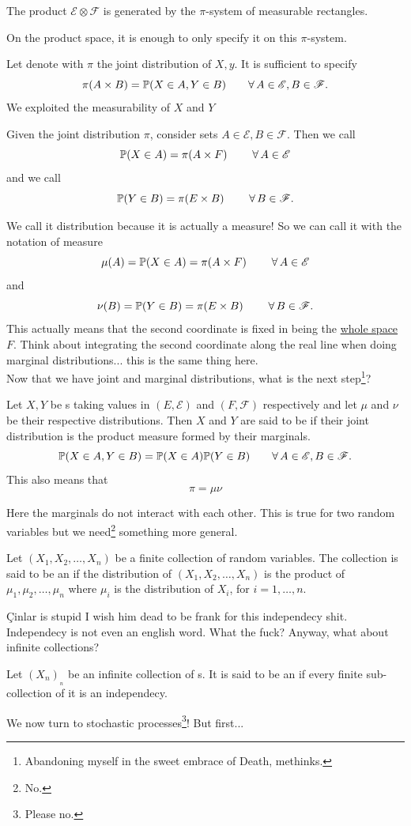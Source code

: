 \documentclass{report}
\begin{document}
\begin{remark}
	The product \sa{} $\mathscr{E}\otimes\mathscr{F}$ is generated by the $\pi$-system of measurable rectangles.
\end{remark}
On the product space, it is enough to only specify it on this $\pi$-system.\par
Let denote with $\pi$ the joint distribution of $X,y$. It is sufficient to specify
\[\pi(A\times B)=\mathbb{P}(X\in A, Y\in B)\qquad\forall\,  A\in\mathscr{E},B\in\mathscr{F}.\]
We exploited the measurability of $X$ and $Y$
\begin{definition}
	Given the joint distribution $\pi$, consider sets $A\in\mathscr{E},B\in\mathscr{F}$. Then we call 
	\[\mathbb{P}(X\in A)=\pi(A\times F)\qquad\;\forall\,  A\in\mathscr{E}\]
	and we call 
	\[\mathbb{P}(Y\in B)=\pi(E\times B)\qquad\;\forall\,  B\in\mathscr{F}.\]
\end{definition}
We call it distribution because it is actually a measure! So we can call it with the notation of measure
	\[\mu(A)=\mathbb{P}(X\in A)=\pi(A\times F)\qquad\;\forall\,  A\in\mathscr{E}\] and \[\nu(B)=\mathbb{P}(Y\in B)=\pi(E\times B)\qquad\;\forall\,  B\in\mathscr{F}.\]This actually means that the second coordinate is fixed in being the \underline{whole space} $F$. Think about integrating the second coordinate along the real line when doing marginal distributions... this is the same thing here.\\
Now that we have joint and marginal distributions, what is the next step\footnote{Abandoning myself in the sweet embrace of Death, methinks.}?
\begin{definition}
	Let $X,Y$ be \rv s taking values in $(E,\mathscr{E})$ and $(F,\mathscr{F})$ respectively and let $\mu$ and $\nu$ be their respective distributions. Then $X$ and $Y$ are said to be  if their joint distribution is the product measure formed by their marginals.
	\[\mathbb{P}(X\in A,Y\in B)=\mathbb{P}(X\in A)\mathbb{P}(Y\in B)\qquad\forall\,  A\in \mathscr{E},B\in\mathscr{F}.\]
	This also means that 
	\[\pi=\mu\nu\]
\end{definition}
Here the marginals do not interact with each other. This is true for two random variables but we need\footnote{No.} something more general.
\begin{definition}
Let $(X_1,X_2,\ldots,X_n)$ be a finite collection of random variables. The collection is said to be an  if the distribution of $(X_1,X_2,\ldots,X_n)$ is the product of $\mu_1,\mu_2,\ldots,\mu_n$ where $\mu_i$ is the distribution of $X_i$, for $i=1,\ldots,n$.
\end{definition}
Çinlar is stupid I wish him dead to be frank for this independecy shit. Independecy is not even an english word. What the fuck? Anyway, what about infinite collections?
\begin{definition}
	Let $(X_n)_{_n}$ be an infinite collection of \rv s. It is said to be an  if every finite sub-collection of it is an independecy.
\end{definition}
We now turn to stochastic processes\footnote{Please no.}! But first...
\end{document}
